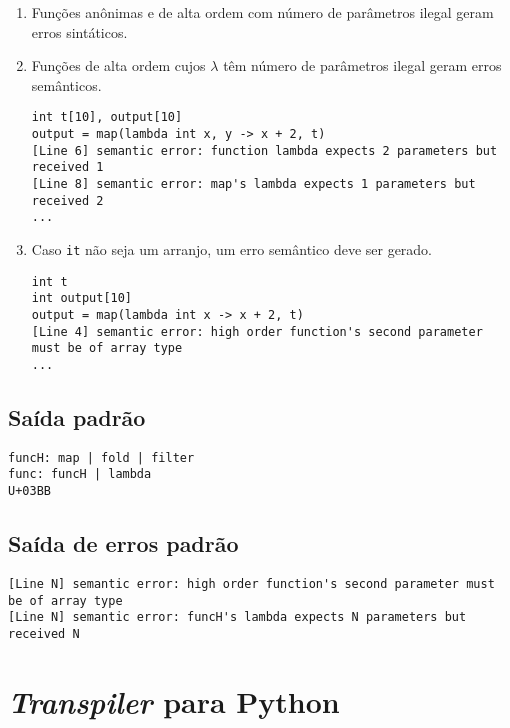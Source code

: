 \documentclass{sftex/sftex}
\newenvironment{smallenum}{
    \vspace{-1mm}
    \begin{enumerate}[label=\roman*.]
    \setlength{\parskip}{0pt}
    \setlength{\itemsep}{2pt}
}{
    \vspace{-2mm}
    \end{enumerate}
}
\begin{document}
\begin{smallenum}

\item Funções anônimas e de alta ordem com número de parâmetros ilegal
    geram erros sintáticos.

\item Funções de alta ordem cujos \texttt{$\lambda$} têm número de
    parâmetros ilegal geram erros semânticos.

\begin{verbatim}
int t[10], output[10]
output = map(lambda int x, y -> x + 2, t)
[Line 6] semantic error: function lambda expects 2 parameters but received 1
[Line 8] semantic error: map's lambda expects 1 parameters but received 2
...
\end{verbatim}

\item Caso \verb!it! não seja um arranjo, um erro semântico deve ser gerado.

\begin{verbatim}
int t
int output[10]
output = map(lambda int x -> x + 2, t)
[Line 4] semantic error: high order function's second parameter must be of array type
...
\end{verbatim}

\end{smallenum}

\subsection{Saída padrão}

\begin{verbatim}
funcH: map | fold | filter
func: funcH | lambda
U+03BB
\end{verbatim}

\subsection{Saída de erros padrão}

\begin{verbatim}
[Line N] semantic error: high order function's second parameter must be of array type
[Line N] semantic error: funcH's lambda expects N parameters but received N
\end{verbatim}

\section{\emph{Transpiler} para Python}
\end{document}
